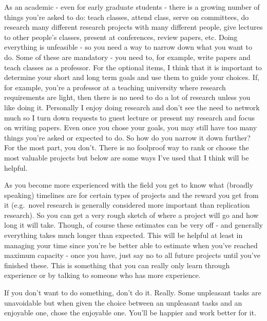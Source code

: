 \documentclass[
  12pt,
  openany]{book}
\begin{document}
As an academic - even for early graduate students - there is a growing number of things you're asked to do: teach classes, attend class, serve on committees, do research many different research projects with many different people, give lectures to other people's classes, present at conferences, review papers, etc. Doing everything is unfeasible - so you need a way to narrow down what you want to do. Some of these are mandatory - you need to, for example, write papers and teach classes as a professor. For the optional items, I think that it is important to determine your short and long term goals and use them to guide your choices. If, for example, you're a professor at a teaching university where research requirements are light, then there is no need to do a lot of research unless you like doing it. Personally I enjoy doing research and don't see the need to network much so I turn down requests to guest lecture or present my research and focus on writing papers. Even once you chose your goals, you may still have too many things you're asked or expected to do. So how do you narrow it down further? For the most part, you don't. There is no foolproof way to rank or choose the most valuable projects but below are some ways I've used that I think will be helpful.

As you become more experienced with the field you get to know what (broadly speaking) timelines are for certain types of projects and the reward you get from it (e.g.~novel research is generally considered more important than replication research). So you can get a very rough sketch of where a project will go and how long it will take. Though, of course these estimates can be very off - and generally everything takes much longer than expected. This will be helpful at least in managing your time since you're be better able to estimate when you've reached maximum capacity - once you have, just say no to all future projects until you've finished these. This is something that you can really only learn through experience or by talking to someone who has more experience.

If you don't want to do something, don't do it. Really. Some unpleasant tasks are unavoidable but when given the choice between an unpleasant tasks and an enjoyable one, chose the enjoyable one. You'll be happier and work better for it.
\end{document}
